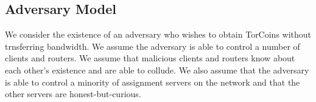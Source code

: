 \subsection{Adversary Model} We consider the existence of an adversary who
wishes to obtain TorCoins without trnsferring bandwidth. We assume the
adversary is able to control a number of clients and routers. We assume that
malicious clients and routers know about each other's existence and are able
to collude. We also assume that the adversary is able to control a minority of
assignment servers on the network and that the other servers are
honest-but-curious.





